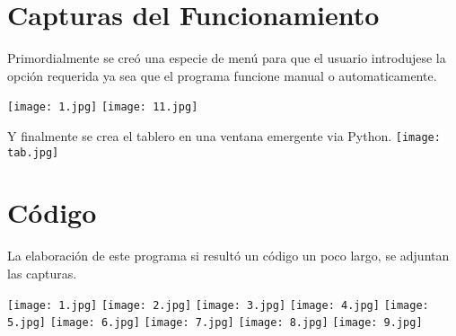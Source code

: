 \documentclass{article}
\begin{document}
	
	
	\section*{Capturas del Funcionamiento}
	Primordialmente se creó una especie de menú para que el usuario introdujese la opción requerida ya sea que el programa funcione manual o automaticamente.
	
	\centering
	\texttt{[image: 1.jpg]}
	\texttt{[image: 11.jpg]}
	
	
	Y finalmente se crea el tablero en una ventana emergente via Python.
	\texttt{[image: tab.jpg]}


	\section*{Código}
	La elaboración de este programa si resultó un código un poco largo, se adjuntan las capturas.
	
	\centering
	\texttt{[image: 1.jpg]}
	\texttt{[image: 2.jpg]}
	\texttt{[image: 3.jpg]}
	\texttt{[image: 4.jpg]}
	\texttt{[image: 5.jpg]}
	\texttt{[image: 6.jpg]}
	\texttt{[image: 7.jpg]}
	\texttt{[image: 8.jpg]}
	\texttt{[image: 9.jpg]}
	
	
	
	

	
\end{document}
